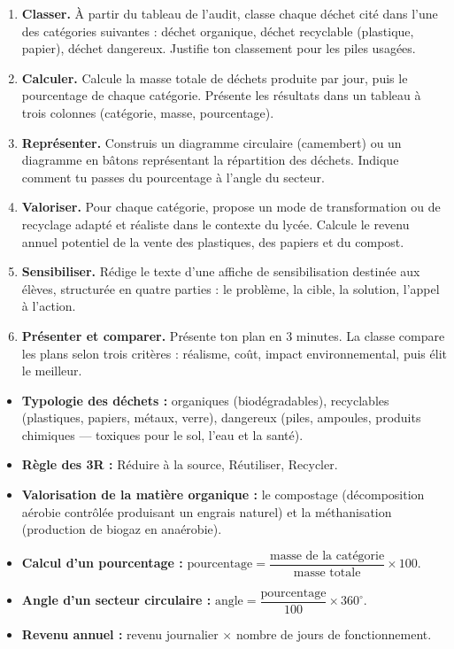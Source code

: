 \documentclass[11pt]{article}
\newcommand{\cle}[1]{{\popxbold\color{popdark}#1}}
\newcounter{popsec}
\newcounter{popsub}
\newcommand{\courssub}[1]{%
  \stepcounter{popsub}%
  \par\vspace{9pt}\noindent{\popxbold\fontsize{11.5}{13}\selectfont\color{popink}{\color{poporange}\thepopsec.\thepopsub}\hspace{6pt}#1}\par\nopagebreak\vspace{4pt}
}
\begin{document}
\begin{enumerate}
\item \textbf{Classer.} À partir du tableau de l'audit, classe chaque déchet cité dans l'une des catégories suivantes : déchet organique, déchet recyclable (plastique, papier), déchet dangereux. Justifie ton classement pour les piles usagées.
\item \textbf{Calculer.} Calcule la masse totale de déchets produite par jour, puis le pourcentage de chaque catégorie. Présente les résultats dans un tableau à trois colonnes (catégorie, masse, pourcentage).
\item \textbf{Représenter.} Construis un diagramme circulaire (camembert) ou un diagramme en bâtons représentant la répartition des déchets. Indique comment tu passes du pourcentage à l'angle du secteur.
\item \textbf{Valoriser.} Pour chaque catégorie, propose un mode de transformation ou de recyclage adapté et réaliste dans le contexte du lycée. Calcule le revenu annuel potentiel de la vente des plastiques, des papiers et du compost.
\item \textbf{Sensibiliser.} Rédige le texte d'une affiche de sensibilisation destinée aux élèves, structurée en quatre parties : le problème, la cible, la solution, l'appel à l'action.
\item \textbf{Présenter et comparer.} Présente ton plan en 3 minutes. La classe compare les plans selon trois critères : réalisme, coût, impact environnemental, puis élit le meilleur.
\end{enumerate}

\courssub{Ressources à mobiliser}

\begin{aretenir}
\begin{itemize}
\item \textbf{Typologie des déchets :} organiques (biodégradables), recyclables (plastiques, papiers, métaux, verre), dangereux (piles, ampoules, produits chimiques — toxiques pour le sol, l'eau et la santé).
\item \textbf{Règle des 3R :} \cle{Réduire} à la source, \cle{Réutiliser}, \cle{Recycler}.
\item \textbf{Valorisation de la matière organique :} le \cle{compostage} (décomposition aérobie contrôlée produisant un engrais naturel) et la méthanisation (production de \cle{biogaz} en anaérobie).
\item \textbf{Calcul d'un pourcentage :} $\text{pourcentage} = \dfrac{\text{masse de la catégorie}}{\text{masse totale}} \times 100$.
\item \textbf{Angle d'un secteur circulaire :} $\text{angle} = \dfrac{\text{pourcentage}}{100} \times 360^{\circ}$.
\item \textbf{Revenu annuel :} revenu journalier $\times$ nombre de jours de fonctionnement.
\end{itemize}
\end{aretenir}
\end{document}
